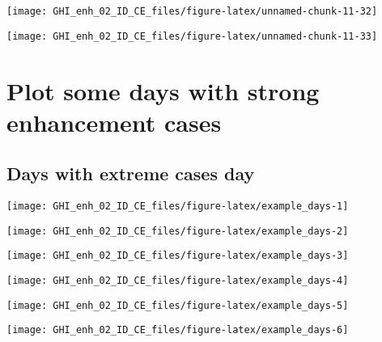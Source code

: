 \documentclass[
  10pt,
  a4paper,oneside]{article}
\begin{document}
\begin{center}\texttt{[image: GHI\_enh\_02\_ID\_CE\_files/figure-latex/unnamed-chunk-11-32]} \end{center}

\begin{center}\texttt{[image: GHI\_enh\_02\_ID\_CE\_files/figure-latex/unnamed-chunk-11-33]} \end{center}

\FloatBarrier

\hypertarget{plot-some-days-with-strong-enhancement-cases}{%
\section{Plot some days with strong enhancement cases}\label{plot-some-days-with-strong-enhancement-cases}}

\FloatBarrier

\hypertarget{days-with-extreme-cases-day}{%
\subsection{Days with extreme cases day}\label{days-with-extreme-cases-day}}

\begin{center}\texttt{[image: GHI\_enh\_02\_ID\_CE\_files/figure-latex/example\_days-1]} \end{center}

\begin{center}\texttt{[image: GHI\_enh\_02\_ID\_CE\_files/figure-latex/example\_days-2]} \end{center}

\begin{center}\texttt{[image: GHI\_enh\_02\_ID\_CE\_files/figure-latex/example\_days-3]} \end{center}

\begin{center}\texttt{[image: GHI\_enh\_02\_ID\_CE\_files/figure-latex/example\_days-4]} \end{center}

\begin{center}\texttt{[image: GHI\_enh\_02\_ID\_CE\_files/figure-latex/example\_days-5]} \end{center}

\begin{center}\texttt{[image: GHI\_enh\_02\_ID\_CE\_files/figure-latex/example\_days-6]} \end{center}
\end{document}
